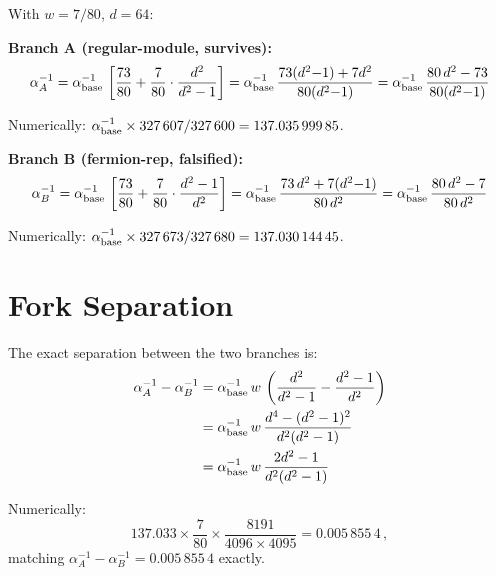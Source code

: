 \documentclass[12pt,a4paper]{article}
\begin{document}
\begin{tcolorbox}[colback=blue!5!white, colframe=blue!50!black,
  title=Exact Branch Formulas]
With $w = 7/80$, $d = 64$:

\textbf{Branch A (regular-module, survives):}
\begin{equation}
\alpha^{-1}_A = \alpha^{-1}_{\rm base}\,
\left[\frac{73}{80} + \frac{7}{80}\cdot\frac{d^2}{d^2-1}\right]
= \alpha^{-1}_{\rm base}\,\frac{73(d^2{-}1) + 7d^2}{80(d^2{-}1)}
= \alpha^{-1}_{\rm base}\,\frac{80\,d^2 - 73}{80(d^2{-}1)}
\end{equation}

Numerically: $\alpha^{-1}_{\rm base} \times 327\,607/327\,600
= 137.035\,999\,85$.

\medskip

\textbf{Branch B (fermion-rep, falsified):}
\begin{equation}
\alpha^{-1}_B = \alpha^{-1}_{\rm base}\,
\left[\frac{73}{80} + \frac{7}{80}\cdot\frac{d^2-1}{d^2}\right]
= \alpha^{-1}_{\rm base}\,\frac{73\,d^2 + 7(d^2{-}1)}{80\,d^2}
= \alpha^{-1}_{\rm base}\,\frac{80\,d^2 - 7}{80\,d^2}
\end{equation}

Numerically: $\alpha^{-1}_{\rm base} \times 327\,673/327\,680
= 137.030\,144\,45$.
\end{tcolorbox}

\section{Fork Separation}
\label{sec:separation}

The exact separation between the two branches is:
\begin{align}
\alpha^{-1}_A - \alpha^{-1}_B
&= \alpha^{-1}_{\rm base}\,w\,
\left(\frac{d^2}{d^2-1} - \frac{d^2-1}{d^2}\right) \nonumber\\
&= \alpha^{-1}_{\rm base}\,w\,
\frac{d^4 - (d^2-1)^2}{d^2(d^2-1)} \nonumber\\
&= \alpha^{-1}_{\rm base}\,w\,
\frac{2d^2 - 1}{d^2(d^2-1)}
\end{align}

Numerically:
\begin{equation}
137.033 \times \frac{7}{80} \times \frac{8191}{4096 \times 4095}
= 0.005\,855\,4\,,
\end{equation}
matching $\alpha^{-1}_A - \alpha^{-1}_B = 0.005\,855\,4$ exactly.
\end{document}
